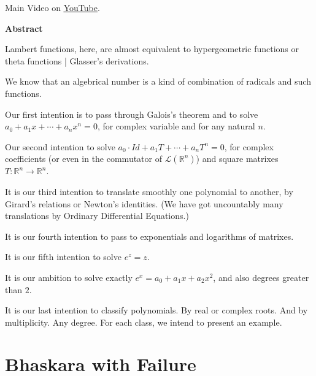 \documentclass[12pt,a4paper]{article}
\begin{document}
Main Video on \href{https://www.youtube.com/watch?v=V9X3EwOlvwg}{\color{blue}\underline{YouTube}}.

\Large

\vspace{6mm}

\textbf{Abstract}

\normalsize

\vspace{6mm}

Lambert functions, here, are almost equivalent to hypergeometric functions or theta functions | Glasser's derivations.

We know that an algebrical number is a kind of combination of radicals and such functions.

Our first intention is to pass through Galois's theorem and to solve $a_0 + a_1 x + \cdots + a_n x^n = 0$, for complex variable and for any natural $n$.

Our second intention to solve $a_0\cdot Id + a_1 T + \cdots + a_n T^n = 0$, for complex coefficients (or even in the commutator of $\mathcal{L}(\mathbb{R}^n)$) and square matrixes $T : \mathbb{R}^n \to \mathbb{R}^n$.

It is our third intention to translate smoothly one polynomial to another, by Girard's relations or Newton's identities.
(We have got uncountably many translations by Ordinary Differential Equations.)

It is our fourth intention to pass to exponentials and logarithms of matrixes.

It is our fifth intention to solve $e^z = z$.

It is our ambition to solve exactly $e^x = a_0 + a_1 x + a_2 x^2$, and also degrees greater than $2$.

It is our last intention to classify polynomials. By real or complex roots. And by multiplicity. Any degree. For each class, we intend to present an example.

\section{Bhaskara with Failure}
\end{document}
